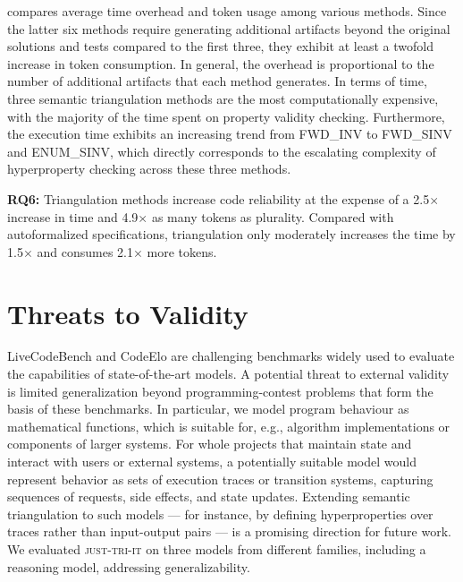 \documentclass[acmsmall,screen,nonacm]{acmart}
\newcommand{\toolName}{\textsc{just-tri-it}\xspace}
\begin{document}
 compares average time overhead and token usage among various methods. Since the latter six methods require generating additional artifacts beyond the original solutions and tests compared to the first three, they exhibit at least a twofold increase in token consumption. In general, the overhead is proportional to the number of additional artifacts that each method generates. In terms of time, three semantic triangulation methods are the most computationally expensive, with the majority of the time spent on property validity checking. Furthermore, the execution time exhibits an increasing trend from FWD\_INV to FWD\_SINV and ENUM\_SINV, which directly corresponds to the escalating complexity of hyperproperty checking across these three methods.

\begin{tcolorbox}[colback=gray!5, colframe=black!20, arc=2pt, boxrule=0.3mm, breakable, sharp corners, left=2pt, right=2pt, top=2pt, bottom=2pt]
\textbf{RQ6:} Triangulation methods increase code reliability at the expense of a 2.5$\times$ increase in time and 4.9$\times$ as many tokens as plurality. Compared with autoformalized specifications, triangulation only moderately increases the time by 1.5$\times$ and consumes 2.1$\times$ more tokens. 
\end{tcolorbox}

\section{Threats to Validity}
\label{sec:threats}

LiveCodeBench and CodeElo are challenging benchmarks widely used to evaluate the capabilities of state-of-the-art models. A potential threat to external validity is limited generalization beyond programming-contest problems that form the basis of these benchmarks. In particular, we model program behaviour as mathematical functions, which is suitable for, e.g., algorithm implementations or components of larger systems. For whole projects that maintain state and interact with users or external systems, a potentially suitable model would represent behavior as sets of execution traces or transition systems, capturing sequences of requests, side effects, and state updates. Extending semantic triangulation to such models --- for instance, by defining hyperproperties over traces rather than input-output pairs --- is a promising direction for future work. We evaluated \toolName on three models from different families, including a reasoning model, addressing generalizability.
\end{document}
